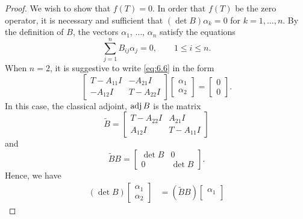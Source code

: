 \begin{proof}
    We wish to show that \(f\left(T\right)=0\). In order that \(f\left(T\right)\) be the zero operator, it is necessary and sufficient that \(\left(\det B\right)\alpha_k=0\) for \(k=1,\ldots,n\). By the definition of \(B\), the vectors \(\alpha_1\), \(\ldots\), \(\alpha_n\) satisfy the equations
    \begin{equation}
        \sum_{j=1}^nB_{ij}\alpha_j=0,\qquad1\leqslant i\leqslant n.\label{eq:6.6}
    \end{equation}
    When \(n=2\), it is suggestive to write \eqref{eq:6.6} in the form
    \begin{equation*}
        \begin{bmatrix}
            T-A_{11}I & -A_{21}I \\
            -A_{12}I & T-A_{22}I
        \end{bmatrix}
        \begin{bmatrix}
            \alpha_1 \\
            \alpha_2
        \end{bmatrix}
        =
        \begin{bmatrix}
            0 \\
            0
        \end{bmatrix}
        .
    \end{equation*}
    In this case, the classical adjoint, \(\operatorname{adj} B\) is the matrix
    \begin{equation*}
        \tilde{B}=
        \begin{bmatrix}
            T-A_{22}I & A_{21}I \\
            A_{12}I & T-A_{11}I
        \end{bmatrix}
    \end{equation*}
    and
    \begin{equation*}
        \tilde{B}B=
        \begin{bmatrix}
            \det B & 0 \\
            0 & \det B
        \end{bmatrix}
        .
    \end{equation*}
    Hence, we have
    \begin{align*}
        \left(\det B\right)
        \begin{bmatrix}
            \alpha_1 \\
            \alpha_2
        \end{bmatrix}
        &=\left(\tilde{B}B\right)
        \begin{bmatrix}
            \alpha_1 \\

\end{bmatrix}
\end{align*}
\end{proof}
